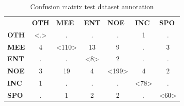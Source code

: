 \documentclass[
10pt, %
a4paper, %
oneside, %
headinclude,footinclude, %
BCOR5mm, %
]{scrartcl}
\begin{document}
\begin{table}[h]
\caption[Confusion matrix devset annotation]{Confusion matrix test dataset annotation }
\begin{tabular}{lcccccc}
                                  & \multicolumn{1}{l}{\textbf{OTH}}            & \multicolumn{1}{l}{\textbf{MEE}}              & \multicolumn{1}{l}{\textbf{ENT}}            & \multicolumn{1}{l}{\textbf{NOE}}              & \multicolumn{1}{l}{\textbf{INC}}             & \multicolumn{1}{l}{\textbf{SPO}}    \\ \cline{2-7} 
\multicolumn{1}{l|}{\textbf{OTH}} & \multicolumn{1}{c|}{\textless.\textgreater} & \multicolumn{1}{c|}{.}                        & \multicolumn{1}{c|}{.}                      & \multicolumn{1}{c|}{.}                        & \multicolumn{1}{c|}{1}                       & \multicolumn{1}{c|}{.}              \\ \cline{2-7} 
\multicolumn{1}{l|}{\textbf{MEE}} & \multicolumn{1}{c|}{4}                      & \multicolumn{1}{c|}{\textless110\textgreater} & \multicolumn{1}{c|}{13}                     & \multicolumn{1}{c|}{9}                        & \multicolumn{1}{c|}{.}                       & \multicolumn{1}{c|}{3}              \\ \cline{2-7} 
\multicolumn{1}{l|}{\textbf{ENT}} & \multicolumn{1}{c|}{.}                      & \multicolumn{1}{c|}{.}                        & \multicolumn{1}{c|}{\textless8\textgreater} & \multicolumn{1}{c|}{2}                        & \multicolumn{1}{c|}{.}                       & \multicolumn{1}{c|}{.}              \\ \cline{2-7} 
\multicolumn{1}{l|}{\textbf{NOE}} & \multicolumn{1}{c|}{3}                      & \multicolumn{1}{c|}{19}                       & \multicolumn{1}{c|}{4}                      & \multicolumn{1}{c|}{\textless199\textgreater} & \multicolumn{1}{c|}{4}                       & \multicolumn{1}{c|}{2}              \\ \cline{2-7} 
\multicolumn{1}{l|}{\textbf{INC}} & \multicolumn{1}{c|}{1}                      & \multicolumn{1}{c|}{.}                        & \multicolumn{1}{c|}{.}                      & \multicolumn{1}{c|}{.}                        & \multicolumn{1}{c|}{\textless78\textgreater} & \multicolumn{1}{c|}{.}              \\ \cline{2-7} 
\multicolumn{1}{l|}{\textbf{SPO}} & \multicolumn{1}{c|}{.}                      & \multicolumn{1}{c|}{1}                        & \multicolumn{1}{c|}{2}                      & \multicolumn{1}{c|}{2}                        & \multicolumn{1}{c|}{.}                       & \multicolumn{1}{c|}{\textless60\textgreater} \\ \cline{2-7} 
\end{tabular}

\end{table}
\newpage
\end{document}

